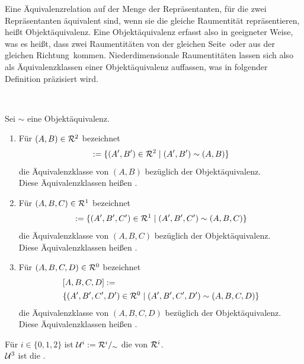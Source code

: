         Eine Äquivalenzrelation auf der Menge der Repräsentanten, für die zwei Repräsentanten äquivalent sind, wenn sie die gleiche Raumentität repräsentieren, heißt Objektäquivalenz.
        Eine Objektäquivalenz erfasst also in geeigneter Weise, was es heißt, dass zwei Raumentitäten \glqq von der gleichen Seite\grqq\ oder \glqq aus der gleichen Richtung\grqq\ kommen.
        Niederdimensionale Raumentitäten lassen sich also als Äquivalenzklassen einer Objektäquivalenz auffassen, was in folgender Definition präzisiert wird.

        \begin{dfn}\ \vspace{8pt}

            \noindent
            Sei $\sim$ eine Objektäquivalenz.
            \begin{enumerate}
                \item Für $(A,B) \in \mathcal{R}^2$ bezeichnet 
                    \begin{align*}
                        [A,B] := \{(A',B') \in \rep^2 \mid (A',B') \sim (A,B)\}
                    \end{align*}
                    die Äquivalenzklasse von $(A,B)$ bezüglich der Objektäquivalenz.\\
                    Diese Äquivalenzklassen heißen .
                    
                \item Für $(A,B,C) \in \mathcal{R}^1$ bezeichnet
                    \begin{align*}
                        [A,B,C] := \{(A',B',C') \in \rep^1 \mid (A',B',C') \sim (A,B,C)\}
                    \end{align*}			 
                    die Äquivalenzklasse von $(A,B,C)$ bezüglich der Objektäquivalenz.\\
                    Diese Äquivalenzklassen heißen .
                \item Für $(A,B,C,D) \in \mathcal{R}^0$ bezeichnet
                    \begin{align*}
                        &[A,B,C,D] := \\
                        &\{(A',B',C',D') \in \mathcal{R}^0 \mid (A',B',C',D') \sim (A,B,C,D)\}
                    \end{align*}			 
                    die Äquivalenzklasse von $(A,B,C,D)$ bezüglich der Objektäquivalenz.\\
                    Diese Äquivalenzklassen heißen .
            \end{enumerate}
            \noindent	
                Für $i \in \{0,1,2\}$ ist $\mathcal{U}^i := \mathcal{R}^i /_\sim$ die  von $\mathcal{R}^i$.\\
                $\mathcal{U}^3$ ist die .
                
        \end{dfn}
        
